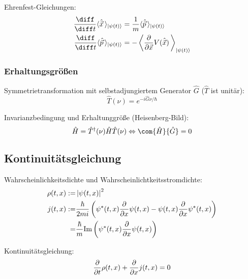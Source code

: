 \documentclass[11pt]{article}
\numberwithin{equation}{section}
\begin{document}
        Ehrenfest-Gleichungen:
        \begin{equation}
          \begin{aligned}
            \tder{}{t} \langle \hat{\vec{x}} \,\rangle_{\Ket{\psi(t)}} &= \frac{1}{m} \langle \hat{\vec{p}} \,\rangle_{\Ket{\psi(t)}} \\
            \tder{}{t} \langle \hat{\vec{p}} \,\rangle_{\Ket{\psi(t)}} &= - \left\langle \pder{}{\vec{x}} V(\hat{\vec{x}}) \,\right\rangle_{\Ket{\psi(t)}} \\
          \end{aligned}
        \end{equation}

      \subsubsection{Erhaltungsgrößen}
        Symmetrietransformation mit selbstadjungiertem Generator $\hat{G}$ ($\hat{T}$ ist unitär):
        \begin{equation}
          \hat{T}(\nu) = e^{-i\hat{G}\nu/\hbar}
        \end{equation}

        Invarianzbedingung und Erhaltunggröße (Heisenberg-Bild):
        \begin{equation}
          \hat{H} =\hat{T}^\dagger(\nu)\hat{H} \hat{T}(\nu) \Leftrightarrow \com{\hat{H}}{\hat{G}} = 0
        \end{equation}

    \subsection{Kontinuitätsgleichung}
      Wahrscheinlichkeitsdichte und Wahrscheinlichtkeitsstromdichte:
      \begin{equation}
        \begin{aligned}
          \rho(t,x) :=& \left|\psi(t,x)\right|^2 \\
          j(t,x) :=& \frac{\hbar}{2mi}\left(
            \psi^*(t,x)\frac{\partial }{\partial x}\psi(t,x) - \psi(t,x)\frac{\partial }{\partial x}\psi^*(t,x)
          \right) \\
          =& \frac{\hbar}{m} \mathrm{Im}\left(
            \psi^*(t,x) \frac{\partial }{\partial x}\psi(t,x)
          \right)\\
        \end{aligned}
      \end{equation}

      Kontinuitätsgleichung:
      \begin{equation}
        \frac{\partial }{\partial t}\rho(t,x) + \frac{\partial }{\partial x}j(t,x) = 0
      \end{equation}
\end{document}
